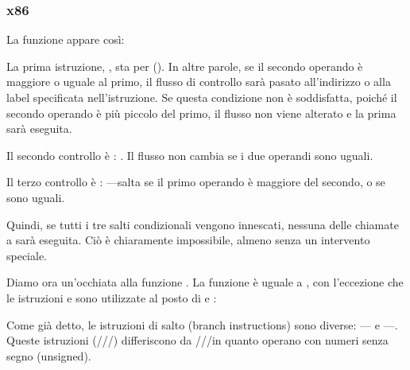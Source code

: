 \subsubsection{x86}


La funzione  appare così:




La prima istruzione, \JLE, sta per  (). 
In altre parole, se il secondo operando è
maggiore o uguale al primo, il flusso di controllo sarà pasato all'indirizzo o alla label specificata nell'istruzione. 
Se questa condizione non è soddisfatta, poiché il secondo operando è più piccolo del primo, il flusso non viene alterato e la prima \printf sarà eseguita.

Il secondo controllo è \JNE: .
Il flusso non cambia se i due operandi sono uguali.

Il terzo controllo è \JGE: ---salta se il primo operando è maggiore del secondo, o se sono uguali.

Quindi, se tutti i tre salti condizionali vengono innescati, nessuna delle chiamate a \printf sarà eseguita.
Ciò è chiaramente impossibile, almeno senza un intervento speciale.

Diamo ora un'occhiata alla funzione .
La funzione  è uguale a , con l'eccezione che le istruzioni \JBE e \JAE
sono utilizzate al posto di \JLE e \JGE:




Come già detto, le istruzioni di salto (branch instructions) sono diverse:
\JBE--- e \JAE---.
Queste istruzioni (\JA/\JAE/\JB/\JBE) differiscono da \JG/\JGE/\JL/\JLE in quanto operano con numeri senza segno (unsigned).


